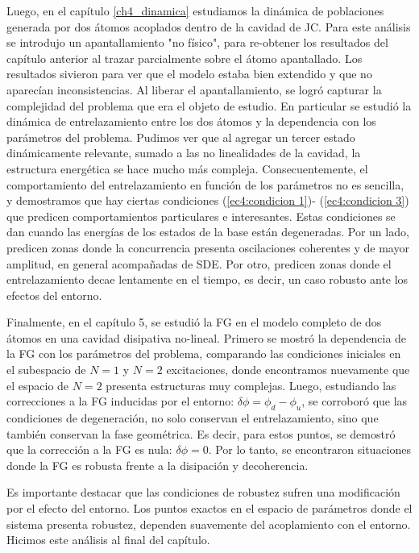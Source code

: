 Luego, en el capítulo \ref{ch4_dinamica} estudiamos la dinámica de poblaciones generada por dos átomos acoplados dentro de la cavidad de JC. Para este análisis se introdujo un apantallamiento "no físico", para re-obtener los resultados del capítulo anterior al trazar parcialmente sobre el átomo apantallado. Los resultados sivieron para ver que el modelo estaba bien extendido y que no aparecían inconsistencias. Al liberar el apantallamiento, se logró capturar la complejidad del problema que era el objeto de estudio. En particular se estudió la dinámica de entrelazamiento entre los dos átomos y la dependencia con los parámetros del problema. Pudimos ver que al agregar un tercer estado dinámicamente relevante, sumado a las no linealidades de la cavidad, la estructura energética se hace mucho más compleja. Consecuentemente, el comportamiento del entrelazamiento en función de los parámetros no es sencilla, y demostramos que hay ciertas condiciones (\ref{ec4:condicion 1})- (\ref{ec4:condicion 3}) que predicen comportamientos particulares e interesantes. Estas condiciones se dan cuando las energías de los estados de la base están degeneradas. Por un lado, predicen zonas donde la concurrencia presenta oscilaciones coherentes y de mayor amplitud, en general acompañadas de SDE. Por otro, predicen zonas donde el entrelazamiento decae lentamente en el tiempo, es decir, un caso robusto ante los efectos del entorno.  

Finalmente, en el capítulo 5, se estudió la FG en el modelo completo de dos átomos en una cavidad disipativa no-lineal. Primero se mostró la dependencia de la FG con los parámetros del problema, comparando las condiciones iniciales en el subespacio de $N=1$ y $N=2$ excitaciones, donde encontramos  nuevamente que el espacio de $N=2$ presenta estructuras muy complejas. Luego, estudiando las correcciones a la FG inducidas por el entorno: $\delta\phi=\phi_d-\phi_u$, se corroboró que las condiciones de degeneración, no solo conservan el entrelazamiento, sino que también conservan la fase geométrica. Es decir, para estos puntos, se demostró que la corrección a la FG es nula: $\delta\phi=0$. Por lo tanto, se encontraron situaciones donde la FG es robusta frente a la disipación y decoherencia. 

Es importante destacar que las condiciones de robustez sufren una modificación por el efecto del entorno. Los puntos exactos en el espacio de parámetros donde el sistema presenta robustez, dependen suavemente del acoplamiento con el entorno. Hicimos este análisis al final del capítulo. 

